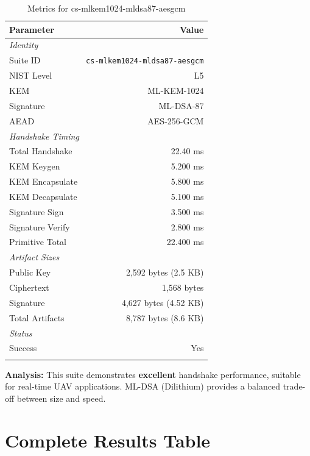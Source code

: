 \documentclass[11pt,a4paper,twoside]{article}
\begin{document}
\begin{table}[H]
\centering
\caption{Metrics for cs-mlkem1024-mldsa87-aesgcm}
\begin{tabular}{l r}
\toprule
\textbf{Parameter} & \textbf{Value} \\
\midrule
\multicolumn{2}{l}{\textit{Identity}} \\
Suite ID & \texttt{cs-mlkem1024-mldsa87-aesgcm} \\
NIST Level & L5 \\
KEM & ML-KEM-1024 \\
Signature & ML-DSA-87 \\
AEAD & AES-256-GCM \\
\midrule
\multicolumn{2}{l}{\textit{Handshake Timing}} \\
Total Handshake & 22.40 ms \\
KEM Keygen & 5.200 ms \\
KEM Encapsulate & 5.800 ms \\
KEM Decapsulate & 5.100 ms \\
Signature Sign & 3.500 ms \\
Signature Verify & 2.800 ms \\
Primitive Total & 22.400 ms \\
\midrule
\multicolumn{2}{l}{\textit{Artifact Sizes}} \\
Public Key & 2,592 bytes (2.5 KB) \\
Ciphertext & 1,568 bytes \\
Signature & 4,627 bytes (4.52 KB) \\
Total Artifacts & 8,787 bytes (8.6 KB) \\
\midrule
\multicolumn{2}{l}{\textit{Status}} \\
Success & Yes \\
 \\
\bottomrule
\end{tabular}
\end{table}

\textbf{Analysis:} This suite demonstrates \textbf{excellent} handshake performance, suitable for real-time UAV applications. ML-DSA (Dilithium) provides a balanced trade-off between size and speed. 
\appendix
\section{Complete Results Table}
\end{document}
